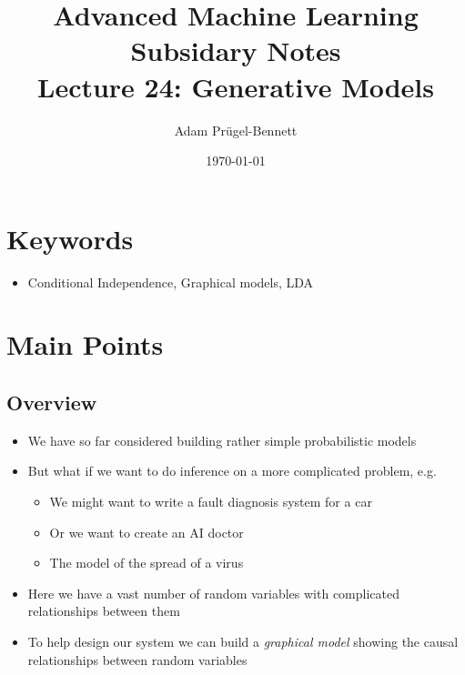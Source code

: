 \documentclass[11pt]{article}
\author{Adam Prügel-Bennett}
\date{\today}
\title{Advanced Machine Learning Subsidary Notes\\\medskip
\large Lecture 24: Generative Models}
\begin{document}
\maketitle

\section{Keywords}
\label{sec:org5308e08}
\begin{itemize}
\item Conditional Independence, Graphical models, LDA
\end{itemize}

\section{Main Points}
\label{sec:orge6c945d}


\subsection{Overview}
\label{sec:orge8b3eb8}
\begin{itemize}
\item We have so far considered building rather simple probabilistic models
\item But what if we want to do inference on a more complicated
problem, e.g.
\begin{itemize}
\item We might want to write a fault diagnosis system for a car
\item Or we want to create an AI doctor
\item The model of the spread of a virus
\end{itemize}
\item Here we have a vast number of random variables with complicated
relationships between them
\item To help design our system we can build a \emph{graphical model}
showing the causal relationships between random variables
\end{itemize}
\end{document}
